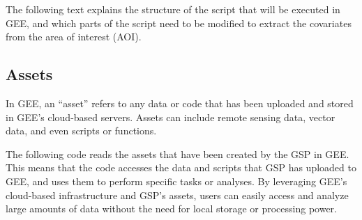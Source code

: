 \documentclass[
  10pt,
  b5paper,
  oneside]{book}
\begin{document}
The following text explains the structure of the script that will be executed in GEE, and which parts of the script need to be modified to extract the covariates from the area of interest (AOI).

\hypertarget{assets}{%
\subsection{Assets}\label{assets}}

In GEE, an ``asset'' refers to any data or code that has been uploaded and stored in GEE's cloud-based servers. Assets can include remote sensing data, vector data, and even scripts or functions.

The following code reads the assets that have been created by the GSP in GEE. This means that the code accesses the data and scripts that GSP has uploaded to GEE, and uses them to perform specific tasks or analyses. By leveraging GEE's cloud-based infrastructure and GSP's assets, users can easily access and analyze large amounts of data without the need for local storage or processing power.
\end{document}
